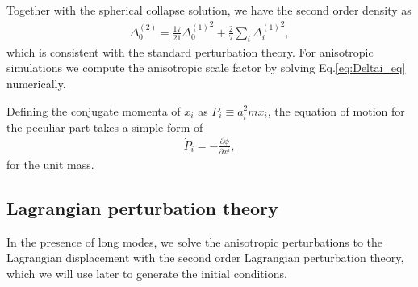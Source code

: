 \documentclass[a4paper,11pt]{article}
\begin{document}
Together with the spherical collapse solution, we have the second order density as
\begin{align}
\Delta_0^{(2)} = 
\frac{17}{21} {\Delta_0^{(1)}}^2 + \frac27 \sum_i {\Delta_i^{(1)}}^2,
\end{align}
which is consistent with the standard perturbation theory.
For anisotropic simulations we compute the anisotropic scale factor
by solving Eq.\eqref{eq:Deltai_eq} numerically.

Defining the conjugate momenta of $x_{i}$ as $P_{i}\equiv a_i^2 m \dot x_{i}$,
the equation of motion for the peculiar part takes a simple form of
\begin{align}
    \dot P_{i} = - \frac{\partial \phi}{\partial x^i},
    \label{eq:mod_EoM}
\end{align}
for the unit mass.



\subsection{Lagrangian perturbation theory}
\label{sub:lpt}

In the presence of long modes, we solve the anisotropic perturbations to the
Lagrangian displacement with the second order Lagrangian perturbation theory,
which we will use later to generate the initial conditions.
\end{document}
